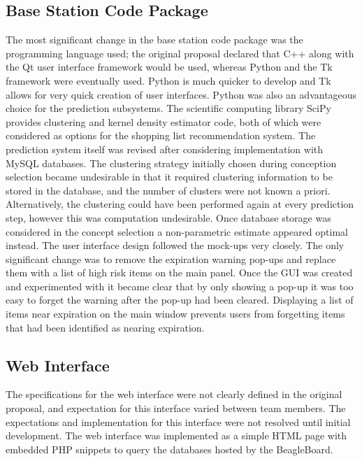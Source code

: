 \documentclass[11pt]{article} %
\begin{document}
\subsection{Base Station Code Package}
The most significant change in the base station code package was the programming language used; the original proposal declared that C++ along with the Qt user interface framework would be used, whereas Python and the Tk framework were eventually used. Python is much quicker to develop and Tk allows for very quick creation of user interfaces. Python was also an advantageous choice for the prediction subsystems. The scientific computing library SciPy provides clustering and kernel density estimator code, both of which were considered as options for the shopping list recommendation system. The prediction system itself was revised after considering implementation with MySQL databases. The clustering strategy initially chosen during conception selection became undesirable in that it required clustering information to be stored in the database, and the number of clusters were not known a priori. Alternatively, the clustering could have been performed again at every prediction step, however this was computation undesirable. Once database storage was considered in the concept selection a non-parametric estimate appeared optimal instead.
\newline \quad \newline
The user interface design followed the mock-ups very closely. The only significant change was to remove the expiration warning pop-ups and replace them with a list of high risk items on the main panel. Once the GUI was created and experimented with it became clear that by only showing a pop-up it was too easy to forget the warning after the pop-up had been cleared. Displaying a list of items near expiration on the main window prevents users from forgetting items that had been identified as nearing expiration.
\subsection{Web Interface}
The specifications for the web interface were not clearly defined in the original proposal, and expectation for this interface varied between team members. The expectations and implementation for this interface were not resolved until initial development. The web interface was implemented as a simple HTML page with embedded PHP snippets to query the databases hosted by the BeagleBoard.
\end{document}
